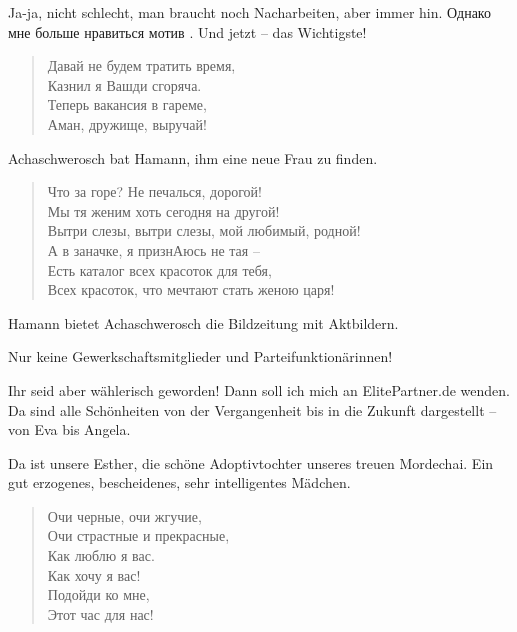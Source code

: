 \documentclass[12pt,a4paper,titlepage]{article}
\begin{document}
\begin{drama}
\ahspeaks
Ja-ja, nicht schlecht, man braucht noch Nacharbeiten, aber immer hin. 
Однако мне больше нравиться мотив .
Und jetzt -- das Wichtigste!

\ahspeaks {}
\begin{verse}
Давай не будем тратить время,\\
Казнил я Вашди сгоряча.\\
Теперь вакансия в гареме,\\
Аман, дружище, выручай!\\
\end{verse}

\uespeaks
Achaschwerosch bat Hamann, ihm eine neue Frau zu finden.

\amspeaks {}
\begin{verse}
Что за горе? Не печалься, дорогой!\\
Мы тя женим хоть сегодня на другой!\\
Вытри слезы, вытри слезы, мой любимый, родной!\\
А в заначке, я признАюсь не тая --\\
Есть каталог всех красоток для тебя,\\
Всех красоток, что мечтают стать женою царя!\\
\end{verse}

\uespeaks
Hamann bietet Achaschwerosch die Bildzeitung mit Aktbildern.

\ahspeaks
Nur keine Gewerkschaftsmitglieder und Parteifunktionärinnen!

\amspeaks
Ihr seid aber wählerisch geworden! Dann soll ich mich an ElitePartner.de wenden.
Da sind alle Schönheiten von der Vergangenheit bis in die Zukunft dargestellt --
von Eva bis Angela.


\scene


\uespeaks
Da ist unsere Esther, die schöne Adoptivtochter unseres treuen Mordechai.
Ein gut erzogenes, bescheidenes, sehr intelligentes Mädchen.

\ahspeaks {}
\begin{verse}
Очи черные, очи жгучие,\\
Очи страстные и прекрасные,\\
Как люблю я вас.\\
Как хочу я вас!\\
Подойди ко мне,\\
Этот час для нас!\\
\end{verse}


\end{drama}
\end{document}
